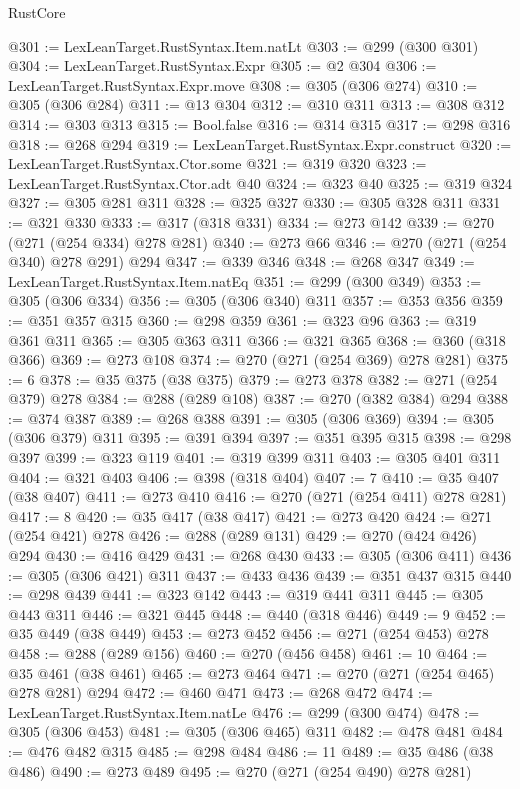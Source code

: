 \begin{lexlean}{RustCore}
\begin{coremodule}
@301 := LexLeanTarget.RustSyntax.Item.natLt
@303 := @299 (@300 @301)
@304 := LexLeanTarget.RustSyntax.Expr
@305 := @2 @304
@306 := LexLeanTarget.RustSyntax.Expr.move
@308 := @305 (@306 @274)
@310 := @305 (@306 @284)
@311 := @13 @304
@312 := @310 @311
@313 := @308 @312
@314 := @303 @313
@315 := Bool.false
@316 := @314 @315
@317 := @298 @316
@318 := @268 @294
@319 := LexLeanTarget.RustSyntax.Expr.construct
@320 := LexLeanTarget.RustSyntax.Ctor.some
@321 := @319 @320
@323 := LexLeanTarget.RustSyntax.Ctor.adt @40
@324 := @323 @40
@325 := @319 @324
@327 := @305 @281 @311
@328 := @325 @327
@330 := @305 @328 @311
@331 := @321 @330
@333 := @317 (@318 @331)
@334 := @273 @142
@339 := @270 (@271 (@254 @334) @278 @281)
@340 := @273 @66
@346 := @270 (@271 (@254 @340) @278 @291) @294
@347 := @339 @346
@348 := @268 @347
@349 := LexLeanTarget.RustSyntax.Item.natEq
@351 := @299 (@300 @349)
@353 := @305 (@306 @334)
@356 := @305 (@306 @340) @311
@357 := @353 @356
@359 := @351 @357 @315
@360 := @298 @359
@361 := @323 @96
@363 := @319 @361 @311
@365 := @305 @363 @311
@366 := @321 @365
@368 := @360 (@318 @366)
@369 := @273 @108
@374 := @270 (@271 (@254 @369) @278 @281)
@375 := 6
@378 := @35 @375 (@38 @375)
@379 := @273 @378
@382 := @271 (@254 @379) @278
@384 := @288 (@289 @108)
@387 := @270 (@382 @384) @294
@388 := @374 @387
@389 := @268 @388
@391 := @305 (@306 @369)
@394 := @305 (@306 @379) @311
@395 := @391 @394
@397 := @351 @395 @315
@398 := @298 @397
@399 := @323 @119
@401 := @319 @399 @311
@403 := @305 @401 @311
@404 := @321 @403
@406 := @398 (@318 @404)
@407 := 7
@410 := @35 @407 (@38 @407)
@411 := @273 @410
@416 := @270 (@271 (@254 @411) @278 @281)
@417 := 8
@420 := @35 @417 (@38 @417)
@421 := @273 @420
@424 := @271 (@254 @421) @278
@426 := @288 (@289 @131)
@429 := @270 (@424 @426) @294
@430 := @416 @429
@431 := @268 @430
@433 := @305 (@306 @411)
@436 := @305 (@306 @421) @311
@437 := @433 @436
@439 := @351 @437 @315
@440 := @298 @439
@441 := @323 @142
@443 := @319 @441 @311
@445 := @305 @443 @311
@446 := @321 @445
@448 := @440 (@318 @446)
@449 := 9
@452 := @35 @449 (@38 @449)
@453 := @273 @452
@456 := @271 (@254 @453) @278
@458 := @288 (@289 @156)
@460 := @270 (@456 @458)
@461 := 10
@464 := @35 @461 (@38 @461)
@465 := @273 @464
@471 := @270 (@271 (@254 @465) @278 @281) @294
@472 := @460 @471
@473 := @268 @472
@474 := LexLeanTarget.RustSyntax.Item.natLe
@476 := @299 (@300 @474)
@478 := @305 (@306 @453)
@481 := @305 (@306 @465) @311
@482 := @478 @481
@484 := @476 @482 @315
@485 := @298 @484
@486 := 11
@489 := @35 @486 (@38 @486)
@490 := @273 @489
@495 := @270 (@271 (@254 @490) @278 @281)

\end{coremodule}
\end{lexlean}

